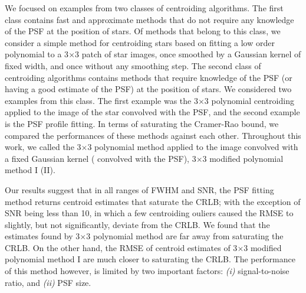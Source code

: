 \documentclass[12pt, preprint]{aastex}
\begin{document}
We focused on examples from two classes of centroiding algorithms. The first class contains fast and approximate
methods that do not require any knowledge of the PSF at the position of stars. Of methods that belong to this class,
we consider a simple method for centroiding stars based on fitting a low order
polynomial to a 3$\times$3 patch of star images, once smoothed by a Gaussian kernel of fixed width, and once without any smoothing step. 
The second class of centroiding algorithms contains methods that require knowledge of the PSF (or having a good estimate
of the PSF) at the position of stars. We considered two examples from this class. The first example
was the 3$\times$3 polynomial centroiding applied to the image of the star convolved with the PSF, and the
second example is the PSF profile fitting. In terms of saturating the Cramer-Rao bound, we compared 
the performances of these methods against each other. Throughout this work, we called the 3$\times$3 polynomial method applied 
to the image convolved with a fixed Gaussian kernel ( convolved with the PSF), 3$\times$3 modified polynomial method I (II).

Our results suggest that in all ranges of FWHM and SNR, the PSF fitting method returns 
centroid estimates that saturate the CRLB; with the exception of SNR being less than 10, 
in which a few centroiding ouliers caused the RMSE to slightly, but not significantly, deviate
from the CRLB. We found that the estimates found by 3$\times$3 polynomial method are far away from
saturating the CRLB. On the other hand, the RMSE of centroid estimates of 
3$\times$3 modified polynomial method I are much closer to saturating the CRLB.
The performance of this method however, is limited by
two important factors: \emph{(i)} signal-to-noise ratio, and \emph{(ii)} PSF size.
\end{document}
